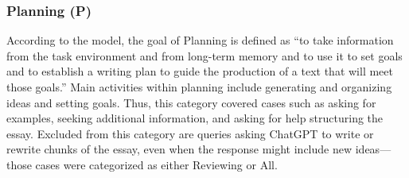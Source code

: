 \documentclass[manuscript,screen,acmsmall]{acmart}
\begin{document}
\subsubsection{Planning (P)}
According to the model, the goal of Planning is defined as ``to take information from the task environment and from long-term memory and to use it to set goals and to establish a writing plan to guide the production of a text that will meet those goals.''
Main activities within planning include generating and organizing ideas and setting goals.
Thus, this category covered cases such as asking for examples, seeking additional information, and asking for help structuring the essay.
Excluded from this category are queries asking ChatGPT to write or rewrite chunks of the essay, even when the response might include new ideas---those cases were categorized as either Reviewing or All.

    
\end{document}
